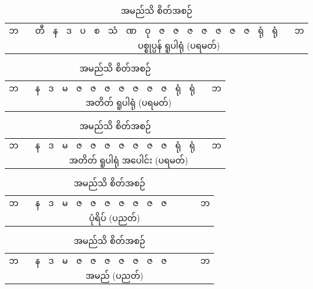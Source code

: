 \commentarytable

\begin{table}[h]
	\centering
 \caption{အနုဗန္ဓကဝီထိ} \label{}
 \begin{subtable}[b]{1.0\linewidth}
	\centering
     \caption{ဖြစ်ဆဲသိ စိတ်အစဉ်} \label{1}
	\begin{tabular}{ccccc|cccccccccccccc|cc}
		ဘ & & တီ & န & ဒ & ပ & စ & သံ & ဏ & ဝု & ဇ & ဇ & ဇ & ဇ & ဇ & ဇ & ဇ & ရုံ & ရုံ &  & ဘ \\
  \cmidrule{6-19}
  &&&&& \multicolumn{14}{c|}{ပစ္စုပ္ပန် ရူပါရုံ (ပရမတ်)} && \\
	\end{tabular}
 \end{subtable}
\vspace{2ex}

 \begin{subtable}[b]{1.0\linewidth}
	\centering
     \caption{ဖြစ်ပြီးသိ စိတ်အစဉ်} \label{2}
	\begin{tabular}{cccc|cccccccccc|cc}
		ဘ &  & န & ဒ & မ & ဇ & ဇ & ဇ & ဇ & ဇ & ဇ & ဇ & ရုံ & ရုံ &  & ဘ \\
    \cmidrule{5-14}
  &&&& \multicolumn{10}{c|}{အတိတ် ရူပါရုံ (ပရမတ်)} && \\
	\end{tabular}
 \end{subtable}
\vspace{2ex}

 \begin{subtable}[b]{1.0\linewidth}
	\centering
	\begin{tabular}{cccc|cccccccccc|cc}
		ဘ &  & န & ဒ & မ & ဇ & ဇ & ဇ & ဇ & ဇ & ဇ & ဇ & ရုံ & ရုံ &  & ဘ \\
    \cmidrule{5-14}
  &&&& \multicolumn{10}{c|}{အတိတ် ရူပါရုံ အ​ပေါင်း (ပရမတ်)} && \\
	\end{tabular}
 \end{subtable}
\vspace{2ex}

 \begin{subtable}[b]{1.0\linewidth}
	\centering
     \caption{ဒြပ်သိ စိတ်အစဉ်} \label{4}
	\begin{tabular}{cccc|cccccccc|cccc}
		ဘ &  & န & ဒ & မ & ဇ & ဇ & ဇ & ဇ & ဇ & ဇ & ဇ &  &  &  & ဘ \\
  \cmidrule{5-12}
  &&&& \multicolumn{8}{c|}{ပုံရိပ် (ပညတ်)} &&&& \\
	\end{tabular}
 \end{subtable}
\vspace{2ex}

 \begin{subtable}[b]{1.0\linewidth}
	\centering
     \caption{အမည်သိ စိတ်အစဉ်} \label{5}
	\begin{tabular}{cccc|cccccccc|cccc}
		ဘ &  & န & ဒ & မ & ဇ & ဇ & ဇ & ဇ & ဇ & ဇ & ဇ &  &  &  & ဘ \\
  \cmidrule{5-12}
  &&&& \multicolumn{8}{c|}{အမည် (ပညတ်)} &&&& \\
	\end{tabular}
 \end{subtable}
 
\end{table}